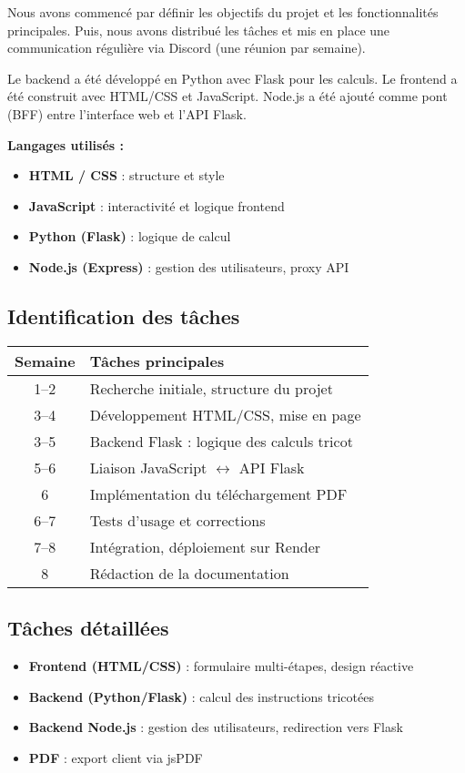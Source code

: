 \documentclass{article}
\begin{document}
Nous avons commencé par définir les objectifs du projet et les fonctionnalités principales. Puis, nous avons distribué les tâches et mis en place une communication régulière via Discord (une réunion par semaine).

Le backend a été développé en Python avec Flask pour les calculs. Le frontend a été construit avec HTML/CSS et JavaScript. Node.js a été ajouté comme pont (BFF) entre l'interface web et l'API Flask.

\textbf{Langages utilisés :}
\begin{itemize}
    \item \textbf{HTML / CSS} : structure et style
    \item \textbf{JavaScript} : interactivité et logique frontend
    \item \textbf{Python (Flask)} : logique de calcul
    \item \textbf{Node.js (Express)} : gestion des utilisateurs, proxy API
\end{itemize}

\subsection{Identification des tâches}
\begin{longtable}{|c|p{10cm}|}
\hline
\textbf{Semaine} & \textbf{Tâches principales} \\
\hline
1--2 & Recherche initiale, structure du projet \\
3--4 & Développement HTML/CSS, mise en page \\
3--5 & Backend Flask : logique des calculs tricot \\
5--6 & Liaison JavaScript $\leftrightarrow$ API Flask \\
6 & Implémentation du téléchargement PDF \\
6--7 & Tests d'usage et corrections \\
7--8 & Intégration, déploiement sur Render \\
8 & Rédaction de la documentation \\
\hline
\end{longtable}

\subsection*{Tâches détaillées}
\begin{itemize}
    \item \textbf{Frontend (HTML/CSS)} : formulaire multi-étapes, design réactive
    \item \textbf{Backend (Python/Flask)} : calcul des instructions tricotées
    \item \textbf{Backend Node.js} : gestion des utilisateurs, redirection vers Flask
    \item \textbf{PDF} : export client via jsPDF
\end{itemize}
\end{document}
